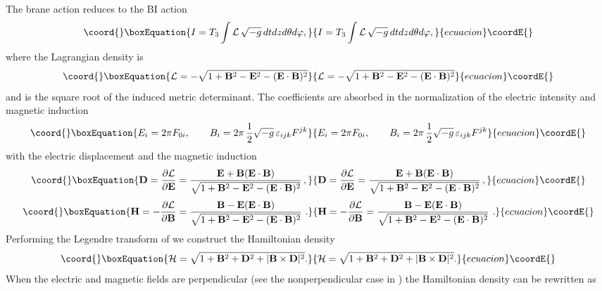 \documentclass[a4paper,12pt]{article}
\begin{document}
The brane action reduces to the BI action
\begin{equation}\coord{}\boxEquation{
I=T_3\int {\cal L}\,\sqrt{-g}\,dtdzd\theta d\varphi,
\label{bi2}
}{
I=T_3\int {\cal L}\,\sqrt{-g}\,dtdzd\theta d\varphi,
}{ecuacion}\coordE{}\end{equation}
where the Lagrangian density \coordHE{} is
\begin{equation}\coord{}\boxEquation{
{\cal L}=-\sqrt{1+{\m}^2-{\e}^2-(\e \cdot \m)^2}
\label{bi3}
}{
{\cal L}=-\sqrt{1+{\m}^2-{\e}^2-(\e \cdot \m)^2}
}{ecuacion}\coordE{}\end{equation}
and \coordHE{} is the square root of the induced metric determinant. The \myHighlight{$2\pi$}\coordHE{} coefficients are absorbed in the normalization of the electric intensity \myHighlight{$\e$}\coordHE{} and magnetic induction \myHighlight{$\m$}\coordHE{}
\begin{equation}\coord{}\boxEquation{
E_i=2\pi F_{0i},\qquad 
B_i=2\pi\,\frac{1}{2}\sqrt{-g}\,{\varepsilon}_{ijk}F^{jk} 
\label{bi4}
}{
E_i=2\pi F_{0i},\qquad 
B_i=2\pi\,\frac{1}{2}\sqrt{-g}\,{\varepsilon}_{ijk}F^{jk} 
}{ecuacion}\coordE{}\end{equation}
with the electric displacement \myHighlight{$\d$}\coordHE{} and the magnetic induction \myHighlight{$\h$}\coordHE{} 
\begin{equation}\coord{}\boxEquation{
\d=\frac{\partial {\cal L}}{\partial \e}=\frac{\e+\m (\e\cdot\m)}{\sqrt{1+
{\m}^2-{\e}^2-(\e\cdot \m)^2}}\, ,
\label{bi5}
}{
\d=\frac{\partial {\cal L}}{\partial \e}=\frac{\e+\m (\e\cdot\m)}{\sqrt{1+
{\m}^2-{\e}^2-(\e\cdot \m)^2}}\, ,
}{ecuacion}\coordE{}\end{equation}
\begin{equation}\coord{}\boxEquation{
\h =-\frac{\partial {\cal L}}{\partial \m}=\frac{\m -\e (\e\cdot\m)}{\sqrt{1+\m^2-\e^2-(\e\cdot\m)^2}}\ .
\label{s1}
}{
\h =-\frac{\partial {\cal L}}{\partial \m}=\frac{\m -\e (\e\cdot\m)}{\sqrt{1+\m^2-\e^2-(\e\cdot\m)^2}}\ .
}{ecuacion}\coordE{}\end{equation}
Performing the Legendre transform of \coordHE{} we construct the Hamiltonian density \coordHE{} 
\begin{equation}\coord{}\boxEquation{
{\cal H}=\sqrt{1+{\m}^2+{\d}^2+|\m\times\d|^2}.
\label{bi6}
}{
{\cal H}=\sqrt{1+{\m}^2+{\d}^2+|\m\times\d|^2}.
}{ecuacion}\coordE{}\end{equation}
When the electric and magnetic fields are perpendicular (see the nonperpendicular case in \cite{bak2}) the Hamiltonian density \coordHE{} can be rewritten as
\end{document}
